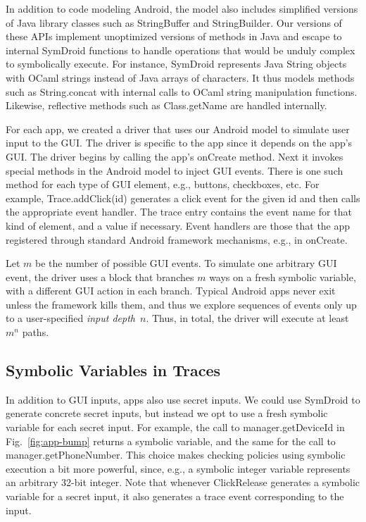 \documentclass{llncs}
\newcommand{\code}[1]{\textsf{#1}} %
\newcommand{\toolname}{ClickRelease\xspace}
\begin{document}
In addition to code modeling Android, the model also
includes simplified versions of Java library classes such as
\code{StringBuffer} and \code{StringBuilder}.  Our versions of
these APIs implement unoptimized versions of methods in
Java and escape to internal SymDroid functions to handle operations that
would be unduly complex to symbolically execute. For instance, SymDroid
represents Java \code{String} objects with OCaml strings instead of
Java arrays of characters. It thus models methods such as \code{String.concat}
with internal calls to OCaml string manipulation functions. Likewise,
reflective methods such as \code{Class.getName} are handled internally.

For each app, we created a driver that uses our Android model to simulate user
input to the GUI. The driver is specific to the app since it depends on the
app's GUI.  The driver begins by calling the app's \code{onCreate}
method. 
Next it invokes special
methods in the Android model to inject GUI events. There is one such method for
each type of GUI element, e.g., buttons, checkboxes, etc. 
For example,
\code{Trace.addClick(id)} generates a click event for the given
\code{id} and then calls the appropriate event handler.
The trace entry contains the event name for that kind of element,
and a value if necessary. 
Event handlers are those
that the app registered through standard Android framework mechanisms,
e.g., in \code{onCreate}.

Let $m$ be the number of possible GUI events.  To simulate one
arbitrary GUI event, the driver uses a block that branches $m$ ways on
a fresh symbolic variable, with a different GUI action in each branch.
Typical Android apps never exit unless the framework kills them, and
thus we explore sequences of events only up to a user-specified
\emph{input depth}~$n$. Thus, in total, the driver will execute
at least $m^n$ paths.

\subsection{Symbolic Variables in Traces}
\label{sec:symbolic-traces}

In addition to GUI inputs, apps also use secret inputs. We could use
SymDroid to generate concrete secret inputs, but instead we opt to use
a fresh symbolic variable for each secret input. For example, the call
to \code{manager.getDeviceId} in Fig.~\ref{fig:app-bump} returns a
symbolic variable, and the same for the call to
\code{manager.getPhoneNumber}. This choice makes checking policies
using symbolic execution a bit more powerful, since, e.g., a symbolic
integer variable represents an arbitrary 32-bit integer. Note that
whenever \toolname generates a symbolic variable for a secret input, it
also generates a trace event corresponding to the input.
\end{document}
